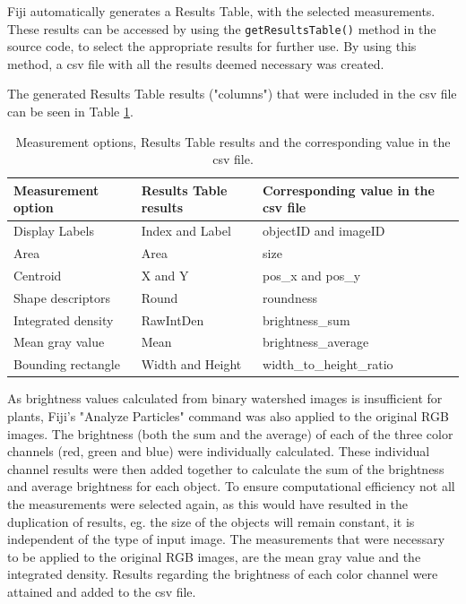 \documentclass[paper=A4,bibliography=totocnumbered]{scrartcl}
\begin{document}
Fiji automatically generates a Results Table, with the selected measurements. These results can be accessed by using the \texttt{getResultsTable()} method in the source code, to select the appropriate results for further use. By using this method, a csv file with all the results deemed necessary was created. 

The generated Results Table results ("columns") that were included in the csv file can be seen in Table \ref{tab:result_table}.
\begin{table}[htbp]
	\centering
	\caption{Measurement options, Results Table results and the corresponding value in the csv file.}
	\begin{tabular}{lll}
		\toprule
		Measurement option & Results Table results  & Corresponding value in the csv file \\
		\midrule
		 Display Labels & Index and Label & objectID and imageID\\
		Area & Area & size\\
		Centroid & X and Y & pos\_x and pos\_y\\
		Shape descriptors & Round & roundness\\
        Integrated density & RawIntDen & brightness\_sum\\
      	Mean gray value & Mean & brightness\_average\\
       	Bounding rectangle & Width and Height & width\_to\_height\_ratio\\
        \bottomrule
	\end{tabular}
	\label{tab:result_table}
\end{table}

As brightness values calculated from binary watershed images is insufficient for plants, Fiji's "Analyze Particles" command was also applied to the original RGB images. The brightness (both the sum and the average) of each of the three color channels (red, green and blue) were individually calculated. These individual channel results were then added together to calculate the sum of the brightness and average brightness for each object. To ensure computational efficiency not all the measurements were selected again, as this would have resulted in the duplication of results, eg. the size of the objects will remain constant, it is independent of the type of input image. The measurements that were necessary to be applied to the original RGB images, are the mean gray value and the integrated density. Results regarding the brightness of each color channel were attained and added to the csv file. 
\end{document}
